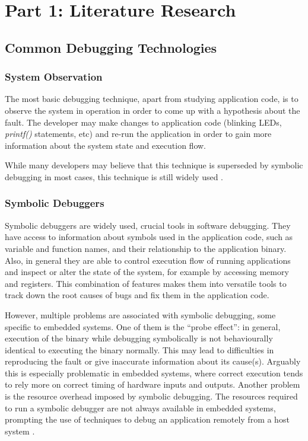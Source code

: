 
\section{Part 1: Literature Research}

\subsection{Common Debugging Technologies}
\label{commondebugtech}

\subsubsection{System Observation}
\label{systemobservation}

The most basic debugging technique, apart from studying application code, is to observe the system in operation in order to come up with a hypothesis about the fault. The developer may make changes to application code (blinking LEDs, \textit{printf()} statements, etc) and re-run the application in order to gain more information about the system state and execution flow.

While many developers may believe that this technique is superseded by symbolic debugging in most cases, this technique is still widely used .

\subsubsection{Symbolic Debuggers}
\label{symbolicdebug}

Symbolic debuggers are widely used, crucial tools in software debugging. They have access to information about symbols used in the application code, such as variable and function names, and their relationship to the application binary. Also, in general they are able to control execution flow of running applications and inspect or alter the state of the system, for example by accessing memory and registers. This combination of features makes them into versatile tools to track down the root causes of bugs and fix them in the application code.

However, multiple problems are associated with symbolic debugging, some specific to embedded systems. One of them is the ``probe effect'': in general, execution of the binary while debugging symbolically is not behaviourally identical to executing the binary normally. This may lead to difficulties in reproducing the fault or give inaccurate information about its cause(s). Arguably this is especially problematic in embedded systems, where correct execution tends to rely more on correct timing of hardware inputs and outputs.
Another problem is the resource overhead imposed by symbolic debugging. The resources required to run a symbolic debugger are not always available in embedded systems, prompting the use of techniques to debug an application remotely from a host system .


